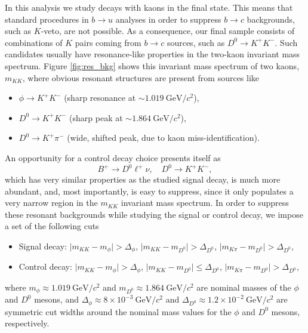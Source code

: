 \documentclass[headings=standardclasses,headings=big,oneside,a4paper,openany,12pt]{scrbook}
\newcommand {\e}[1]{\mathrm{~#1}}
\newcommand {\E}[1]{\times 10^{#1}}
\begin{document}
In this analysis we study decays with kaons in the final state. This means that standard procedures in $b \to u$ analyses in order to suppress $b \to c$ backgrounds, such as $K$-veto, are not possible. As a consequence, our final sample consists of combinations of $K$ pairs coming from $b \to c$  sources, such as $D^0 \to K^+ K^-$. Such candidates usually have resonance-like properties in the two-kaon invariant mass spectrum. Figure \ref{fig:res_bkg} shows this invariant mass spectrum of two kaons, $m_{KK}$, where obvious resonant structures are present from sources like
\begin{itemize}
\item $\phi \to K^+K^-$ (sharp resonance at $\sim1.019\e{GeV}/c^2$),
\item $D^0 \to K^+K^-$ (sharp peak at $\sim 1.864\e{GeV}/c^2$),
\item $D^0 \to K^+ \pi^-$ (wide, shifted peak, due to kaon miss-identification).
\end{itemize}

An opportunity for a control decay choice presents itself as $$B^+ \to D^0 \ell^+ \nu, \quad D^0 \to K^+ K^-,$$ which has very similar properties as the studied signal decay, is much more abundant, and, most importantly, is easy to suppress, since it only populates a very narrow region in the $m_{KK}$ invariant mass spectrum. In order to suppress these resonant backgrounds while studying the signal or control decay, we impose a set of the following cuts

\begin{itemize}
\item Signal decay: $\vert m_{KK} - m_{\phi} \vert > \Delta_\phi$, $\vert m_{KK} - m_{D^0} \vert > \Delta_{D^0}$, $\vert m_{K\pi} - m_{D^0} \vert > \Delta_{D^0}$,
\item Control decay: $\vert m_{KK} - m_{\phi} \vert > \Delta_\phi$, $\vert m_{KK} - m_{D^0} \vert \leq \Delta_{D^0}$, $\vert m_{K\pi} - m_{D^0} \vert > \Delta_{D^0}$,
\end{itemize}

where $m_\phi \approx 1.019\e{GeV}/c^2$ and $m_{D^0} \approx 1.864\e{GeV}/c^2$ are nominal masses of the $\phi$ and $D^0$ mesons, and $\Delta_\phi \approx 8\E{-3}\e{GeV}/c^2$ and $\Delta_{D^0} \approx 1.2\E{-2}\e{GeV}/c^2$ are symmetric cut widths around the nominal mass values for the $\phi$ and $D^0$ mesons, respectively.
\end{document}
